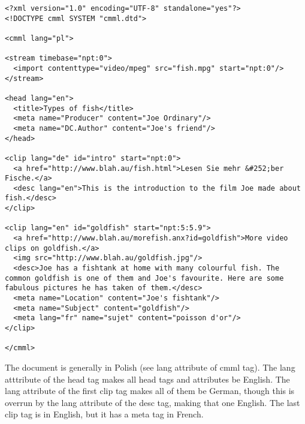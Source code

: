 \footnotesize\begin{verbatim}<?xml version="1.0" encoding="UTF-8" standalone="yes"?>
<!DOCTYPE cmml SYSTEM "cmml.dtd">

<cmml lang="pl">

<stream timebase="npt:0">
  <import contenttype="video/mpeg" src="fish.mpg" start="npt:0"/>
</stream>

<head lang="en">
  <title>Types of fish</title>
  <meta name="Producer" content="Joe Ordinary"/>
  <meta name="DC.Author" content="Joe's friend"/>
</head>

<clip lang="de" id="intro" start="npt:0">
  <a href="http://www.blah.au/fish.html">Lesen Sie mehr &#252;ber Fische.</a>
  <desc lang="en">This is the introduction to the film Joe made about fish.</desc>
</clip>

<clip lang="en" id="goldfish" start="npt:5:5.9">
  <a href="http://www.blah.au/morefish.anx?id=goldfish">More video clips on goldfish.</a>
  <img src="http://www.blah.au/goldfish.jpg"/>
  <desc>Joe has a fishtank at home with many colourful fish. The common goldfish is one of them and Joe's favourite. Here are some fabulous pictures he has taken of them.</desc>
  <meta name="Location" content="Joe's fishtank"/>
  <meta name="Subject" content="goldfish"/>
  <meta lang="fr" name="sujet" content="poisson d'or"/>
</clip>

</cmml>
\end{verbatim}
\normalsize


The document is generally in Polish (see lang attribute of cmml tag). The lang atttribute of the head tag makes all head tags and attributes be English. The lang attribute of the first clip tag makes all of them be German, though this is overrun by the lang attribute of the desc tag, making that one English. The last clip tag is in English, but it has a meta tag in French. 